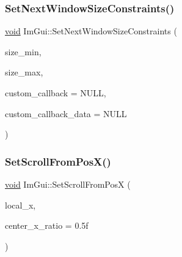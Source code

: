 \subsubsection{\texorpdfstring{Set\+Next\+Window\+Size\+Constraints()}{SetNextWindowSizeConstraints()}}
{\footnotesize\ttfamily \hyperlink{imgui__impl__opengl3__loader_8h_ac668e7cffd9e2e9cfee428b9b2f34fa7}{void} Im\+Gui\+::\+Set\+Next\+Window\+Size\+Constraints (\begin{DoxyParamCaption}\item[{const \hyperlink{structImVec2}{Im\+Vec2} \&}]{size\+\_\+min,  }\item[{const \hyperlink{structImVec2}{Im\+Vec2} \&}]{size\+\_\+max,  }\item[{\hyperlink{imgui_8h_a1cccf55557c2153a9d4af6db73dc3a91}{Im\+Gui\+Size\+Callback}}]{custom\+\_\+callback = {\ttfamily NULL},  }\item[{\hyperlink{imgui__impl__opengl3__loader_8h_ac668e7cffd9e2e9cfee428b9b2f34fa7}{void} $\ast$}]{custom\+\_\+callback\+\_\+data = {\ttfamily NULL} }\end{DoxyParamCaption})}

\mbox{\label{namespaceImGui_ad244660a2f3f2999f645feb9fbdfe0ec}} 
\subsubsection{\texorpdfstring{Set\+Scroll\+From\+Pos\+X()}{SetScrollFromPosX()}\hspace{0.1cm}{\footnotesize\ttfamily [1/2]}}
{\footnotesize\ttfamily \hyperlink{imgui__impl__opengl3__loader_8h_ac668e7cffd9e2e9cfee428b9b2f34fa7}{void} Im\+Gui\+::\+Set\+Scroll\+From\+PosX (\begin{DoxyParamCaption}\item[{float}]{local\+\_\+x,  }\item[{float}]{center\+\_\+x\+\_\+ratio = {\ttfamily 0.5f} }\end{DoxyParamCaption})}

\mbox{\label{namespaceImGui_a6f14aca8066daf670dc2445c5390ecc4}} 
